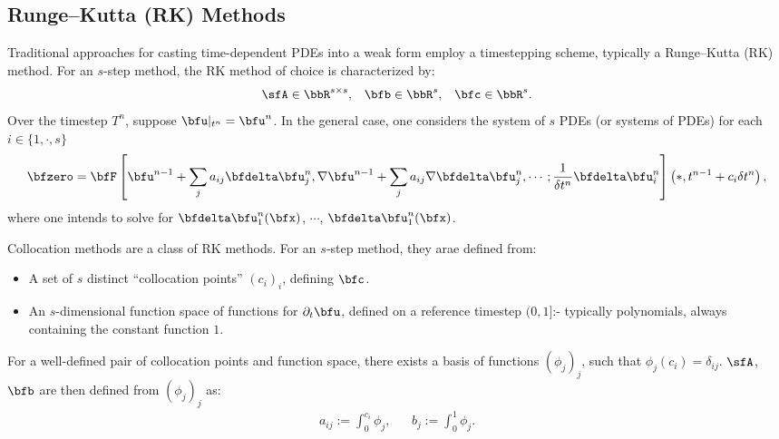 \subsection{Runge--Kutta (RK) Methods}\label{cha:RK methods}
    Traditional approaches for casting time-dependent PDEs into a weak form employ a timestepping scheme, typically a Runge--Kutta (RK) method. For an $s$-step method, the RK method of choice is characterized by:
    \begin{align}
        \sfA  \in  \bbR^{s \times s},  &&
        \bfb  \in  \bbR^{s},  &&
        \bfc  \in  \bbR^{s}.
    \end{align}
    Over the timestep $T^{n}$, suppose $\bfu|_{t^{n}} = \bfu^{n}$. In the general case, one considers the system of $s$ PDEs (or systems of PDEs) for each $i  \in  \{1, \cdot, s\}$ 
    \begin{equation}
        \bfzero  =  \bfF\left[\bfu^{n - 1} + \sum_{j}a_{ij}\bfdelta\bfu^{n}_{j}, \nabla\bfu^{n - 1} + \sum_{j}a_{ij}\nabla\bfdelta\bfu^{n}_{j}, \cdots; \frac{1}{\delta t^{n}}\bfdelta\bfu^{n}_{i}\right]\left(*, t^{n - 1} + c_{i}\delta t^{n}\right),
    \end{equation}
    where one intends to solve for $\bfdelta\bfu^{n}_{1}(\bfx)$, $\cdots$, $\bfdelta\bfu^{n}_{1}(\bfx)$.

    \line
    
    \begin{definition}
        Collocation methods are a class of RK methods. For an $s$-step method, they arae defined from:
        \begin{itemize}
            \item  A set of $s$ distinct ``collocation points'' $(c_{i})_{i}$, defining $\bfc$.
            \item  An $s$-dimensional function space of functions for $\partial_{t}\bfu$, defined on a reference timestep $(0, 1]$:- typically polynomials, always containing the constant function $1$.
        \end{itemize}
        For a well-defined pair of collocation points and function space, there exists a basis of functions $(\phi_{j})_{j}$, such that $\phi_{j}(c_{i})  =  \delta_{ij}$. $\sfA$, $\bfb$ are then defined from $(\phi_{j})_{j}$ as:
        \begin{align}
            a_{ij}  :=  \int_{0}^{c_{i}}\phi_{j},  &&
            b_{j}   :=  \int_{0}^{1}\phi_{j}.
        \end{align}
    \end{definition}
    
